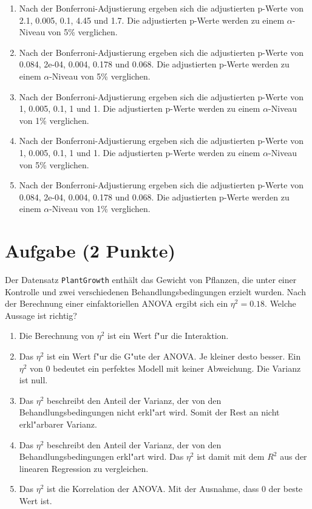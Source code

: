 \documentclass[a4paper, 10pt]{scrartcl}\usepackage[]{graphicx}\usepackage[]{xcolor}
\begin{document}
\begin{enumerate}
\item [\textbf{A} \msquare] Nach der Bonferroni-Adjustierung ergeben sich die adjustierten p-Werte von 2.1, 0.005, 0.1, 4.45 und 1.7. Die adjustierten p-Werte werden zu einem $\alpha$-Niveau von 5\% verglichen.
\item [\textbf{B} \msquare] Nach der Bonferroni-Adjustierung ergeben sich die adjustierten p-Werte von 0.084, 2e-04, 0.004, 0.178 und 0.068. Die adjustierten p-Werte werden zu einem $\alpha$-Niveau von 5\% verglichen.
\item [\textbf{C} \msquare] Nach der Bonferroni-Adjustierung ergeben sich die adjustierten p-Werte von 1, 0.005, 0.1, 1 und 1. Die adjustierten p-Werte werden zu einem $\alpha$-Niveau von 1\% verglichen.
\item [\textbf{D} \msquare] Nach der Bonferroni-Adjustierung ergeben sich die adjustierten p-Werte von 1, 0.005, 0.1, 1 und 1. Die adjustierten p-Werte werden zu einem $\alpha$-Niveau von 5\% verglichen.
\item [\textbf{E} \msquare] Nach der Bonferroni-Adjustierung ergeben sich die adjustierten p-Werte von 0.084, 2e-04, 0.004, 0.178 und 0.068. Die adjustierten p-Werte werden zu einem $\alpha$-Niveau von 1\% verglichen.
\end{enumerate} 

\section{Aufgabe \hfill (2 Punkte)}



Der Datensatz \texttt{PlantGrowth} enth{\"a}lt das Gewicht von Pflanzen, die
unter einer Kontrolle und zwei verschiedenen Behandlungsbedingungen erzielt
wurden. Nach der Berechnung einer einfaktoriellen ANOVA ergibt sich ein
$\eta^2 = 0.18$. Welche Aussage ist richtig?



\begin{enumerate}
\item [\textbf{A} \msquare] Die Berechnung von $\eta^2$ ist ein Wert f{"u}r die Interaktion.
\item [\textbf{B} \msquare] Das $\eta^2$ ist ein Wert f{"u}r die G{"u}te der ANOVA. Je kleiner desto besser. Ein $\eta^2$ von 0 bedeutet ein perfektes Modell mit keiner Abweichung. Die Varianz ist null.
\item [\textbf{C} \msquare] Das $\eta^2$ beschreibt den Anteil der Varianz, der von den Behandlungsbedingungen nicht erkl{"a}rt wird. Somit der Rest an nicht erkl{"a}rbarer Varianz.
\item [\textbf{D} \msquare] Das $\eta^2$ beschreibt den Anteil der Varianz, der von den Behandlungsbedingungen erkl{"a}rt wird. Das $\eta^2$ ist damit mit dem $R^2$ aus der linearen Regression zu vergleichen.
\item [\textbf{E} \msquare] Das $\eta^2$ ist die Korrelation der ANOVA. Mit der Ausnahme, dass 0 der beste Wert ist.
\end{enumerate} 
\end{document}
